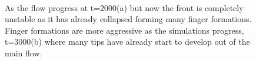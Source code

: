 \documentclass[preprint,authoryear,12pt]{elsarticle}
\begin{document}
\begin{figure}
\centering
{}\\[2mm]%
%
\caption{As the flow progress at t=2000(a) but now the front is completely unstable as it has already collapsed forming many finger formations. Finger formations are more aggressive as the simulations progress, t=3000(b) where many tips have already start to develop out of the main flow.}
\label{fig:3b_heteheleshaw_10}
\end{figure}
\end{document}
